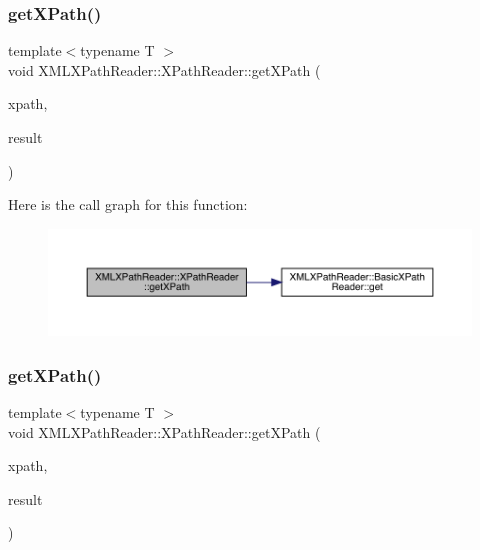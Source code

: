 \subsubsection{\texorpdfstring{getXPath()}{getXPath()}\hspace{0.1cm}{\footnotesize\ttfamily [3/9]}}
{\footnotesize\ttfamily template$<$typename T $>$ \\
void X\+M\+L\+X\+Path\+Reader\+::\+X\+Path\+Reader\+::get\+X\+Path (\begin{DoxyParamCaption}\item[{const std\+::string \&}]{xpath,  }\item[{T \&}]{result }\end{DoxyParamCaption})\hspace{0.3cm}{\ttfamily [inline]}}

Here is the call graph for this function\+:
\nopagebreak
\begin{figure}[H]
\begin{center}
\leavevmode
\includegraphics[width=350pt]{d3/d5a/classXMLXPathReader_1_1XPathReader_abbd673bc00e75502126b2cca246ff6f4_cgraph}
\end{center}
\end{figure}
\mbox{\label{classXMLXPathReader_1_1XPathReader_a82579390a7b37879a7a7d9b79934a592}} 
\subsubsection{\texorpdfstring{getXPath()}{getXPath()}\hspace{0.1cm}{\footnotesize\ttfamily [4/9]}}
{\footnotesize\ttfamily template$<$typename T $>$ \\
void X\+M\+L\+X\+Path\+Reader\+::\+X\+Path\+Reader\+::get\+X\+Path (\begin{DoxyParamCaption}\item[{const std\+::string \&}]{xpath,  }\item[{\mbox{\hyperlink{classXMLTComplex_1_1TComplex}{X\+M\+L\+T\+Complex\+::\+T\+Complex}}$<$ T $>$ \&}]{result }\end{DoxyParamCaption})\hspace{0.3cm}{\ttfamily [inline]}}

